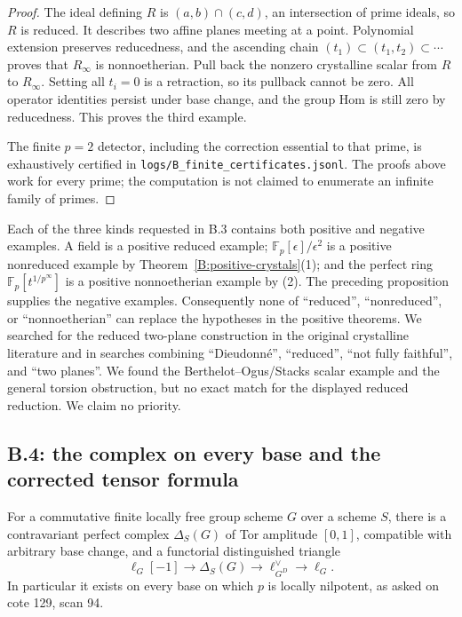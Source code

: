 \begin{proof}
The ideal defining $R$ is $(a,b)\cap(c,d)$, an intersection of
prime ideals, so $R$ is reduced. It describes two affine planes
meeting at a point. Polynomial extension preserves reducedness,
and the ascending chain $(t_1)\subset(t_1,t_2)\subset\cdots$
proves that $R_\infty$ is nonnoetherian. Pull back the nonzero
crystalline scalar from $R$ to $R_\infty$. Setting all $t_i=0$
is a retraction, so its pullback cannot be zero. All operator
identities persist under base change, and the group Hom is still
zero by reducedness. This proves the third example.

The finite $p=2$ detector, including the correction essential to
that prime, is exhaustively certified in
\texttt{logs/B\_finite\_certificates.jsonl}. The proofs above work
for every prime; the computation is not claimed to enumerate an
infinite family of primes.
\end{proof}

\begin{remark}
\label{B:base-kinds}
Each of the three kinds requested in B.3 contains both positive
and negative examples. A field is a positive reduced example;
$\mathbb F_p[\epsilon]/\epsilon^2$ is a positive nonreduced example
by Theorem~\ref{B:positive-crystals}(1); and the perfect ring
$\mathbb F_p[t^{1/p^\infty}]$ is a positive nonnoetherian example
by (2). The preceding proposition supplies the negative examples.
Consequently none of ``reduced'', ``nonreduced'', or
``nonnoetherian'' can replace the hypotheses in the positive
theorems. We searched for the reduced two-plane construction in
the original crystalline literature and in searches combining
``Dieudonn\'e'', ``reduced'', ``not fully faithful'', and
``two planes''. We found the Berthelot--Ogus/Stacks scalar example
and the general torsion obstruction, but no exact match for the
displayed reduced reduction. We claim no priority.
\end{remark}

\subsection{B.4: the complex on every base and the corrected tensor formula}

\begin{theorem}
\label{B:Delta}
For a commutative finite locally free group scheme $G$ over a scheme
$S$, there is a contravariant perfect complex $\Delta_S(G)$ of Tor
amplitude $[0,1]$, compatible with arbitrary base change, and a
functorial distinguished triangle
\begin{equation}\label{B:Delta-triangle}
 \ell_G[-1]\longrightarrow\Delta_S(G)
 \longrightarrow\ell_{G^D}^{\vee}\longrightarrow\ell_G.
\end{equation}
In particular it exists on every base on which $p$ is locally
nilpotent, as asked on cote 129, scan 94.
\end{theorem}

